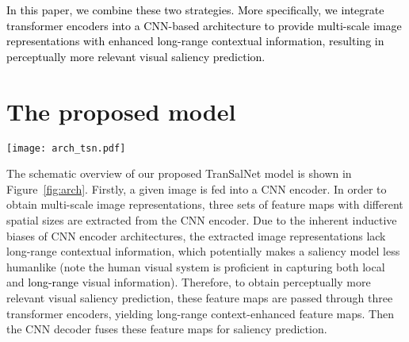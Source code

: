 \documentclass{article}
\begin{document}
\textcolor{black}{
In this paper, we combine these two strategies. 
More specifically, we integrate transformer encoders into a CNN-based architecture to provide multi-scale image representations with enhanced long-range contextual information, 
resulting in perceptually more relevant visual saliency prediction.}



\section{The proposed model}

\begin{figure*}
\centering
\texttt{[image: arch\_tsn.pdf]}
\caption{Schematic overview of TranSalNet. Assume that the spatial size of inputs is $w \times h$. After the input image is processed by the CNN encoder, which provides three sets of multi-scale feature maps have spatial size of $\frac{w}{8}\times\frac{h}{8}$, $\frac{w}{16}\times\frac{h}{16}$, and $\frac{w}{32}\times\frac{h}{32}$, respectively. Then the contextual information of these feature maps is enhanced by transformer encoders. The predicted saliency map is generated by the CNN decoder, which uses skip-connection (\textcolor{black}{orange arrows}) and element-wise production to fuse multi-scale context-enhance feature maps. The illustration of the transformer encoder is shown below the architecture diagram, which consists of standard Multi-head Self-Attention (MSA) and Multi-layer Perceptron (MLP) blocks.}
\label{fig:arch}
\end{figure*}

The schematic overview of our proposed TranSalNet model is shown in Figure~\ref{fig:arch}. 
Firstly, a given image is fed into a CNN encoder. In order to obtain multi-scale image representations, three sets of feature maps with different spatial sizes are extracted from the CNN encoder. Due to the inherent inductive biases of CNN encoder architectures, the extracted image representations lack long-range contextual information, which potentially makes a saliency model less humanlike (note the human visual system is proficient in capturing both local and \textcolor{black}{long-range} visual information). Therefore, to obtain perceptually more relevant visual saliency prediction, these feature maps are passed through three transformer encoders, yielding long-range context-enhanced feature maps. Then the CNN decoder fuses these feature maps for saliency prediction.  
\end{document}
